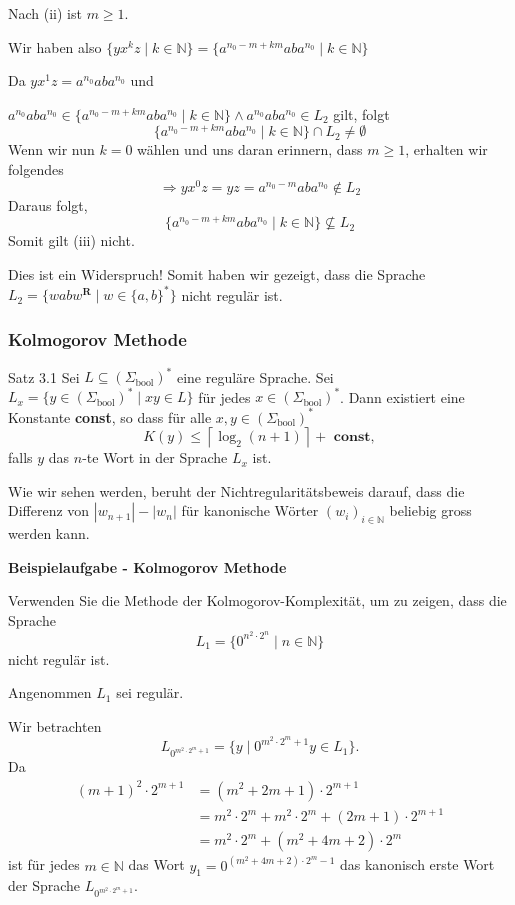 \documentclass[a4paper, 11pt]{article}
\def\N{\mathbb{N}}
\newcommand\myTitle[1]{{\large \textbf {#1}}}
\begin{document}
Nach (ii) ist $m \geq 1$. 

Wir haben also $\{yx^kz \mid k \in \mathbb{N} \} = \{a^{n_0-m+km}aba^{n_0} \mid k \in \mathbb{N} \}$

    Da $yx^1z = a^{n_0}aba^{n_0}$ und

$a^{n_0}aba^{n_0} \in \{a^{n_0-m+km}aba^{n_0} \mid k \in \mathbb{N} \} \land  a^{n_0}aba^{n_0} \in L_2$ gilt, folgt 
$$\{a^{n_0-m+km}aba^{n_0} \mid k \in \mathbb{N} \}  \cap L_2 \neq \emptyset$$
Wenn wir nun $k = 0$ wählen und uns daran erinnern, dass $m \geq 1$, erhalten wir folgendes
$$\Rightarrow yx^0z = yz = a^{n_0-m}aba^{n_0} \notin L_2$$
Daraus folgt,
$$\{a^{n_0-m+km}aba^{n_0} \mid k \in \N \} \nsubseteq L_2$$
Somit gilt (iii) nicht.

Dies ist ein Widerspruch! Somit haben wir gezeigt, dass die Sprache $L_2 = \{wabw^{\textbf{R}} \mid w \in \{a,b\}^*\}$ nicht regulär ist.




    \subsubsection{Kolmogorov Methode}
    \begin{mainbox}{Satz 3.1}
        Sei $L \subseteq (\Sigma_{\text{bool}})^*$ eine reguläre Sprache. Sei $L_x = \{y \in (\Sigma_{\text{bool}})^* \mid xy \in L\}$ für jedes $x\in (\Sigma_{\text{bool}})^*$. Dann existiert eine Konstante \textbf{const}, so dass für alle $x, y \in (\Sigma_\text{bool})^*$
        $$K(y) \leq \left\lceil \log_2(n+1)\right\rceil + \textbf{ const},$$
        falls $y$ das $n$-te Wort in der Sprache $L_x$ ist.
    \end{mainbox}
    Wie wir sehen werden, beruht der Nichtregularitätsbeweis darauf, dass die Differenz von $|w_{n+1}| - |w_n|$ für kanonische Wörter $(w_i)_{i \in \N}$ beliebig gross werden kann.



    \myTitle{Beispielaufgabe - Kolmogorov Methode}

    Verwenden Sie die Methode der Kolmogorov-Komplexität, um zu zeigen, dass die Sprache 
    $$L_1 = \{0^{n^2 \cdot 2^n} \mid n \in \N\}$$
    nicht regulär ist.

    Angenommen $L_1$ sei regulär. 
    
    Wir betrachten 
    $$L_{0^{m^2 \cdot 2^m + 1}} = \{y \mid 0^{m^2 \cdot 2^m + 1}y \in L_1\}.$$
    Da
    \begin{align*}
        (m+1)^2 \cdot 2^{m+1} &= (m^2 + 2m + 1)\cdot 2^{m+1}\\
        &= m^2 \cdot 2^m + m^2 \cdot 2^m + (2m + 1) \cdot 2^{m+1}\\
        &= m^2 \cdot 2^m + (m^2 + 4m + 2) \cdot 2^m
    \end{align*}
    ist für jedes $m \in \N$ das Wort $y_1 = 0^{(m^2 + 4m + 2) \cdot 2^m - 1}$ das kanonisch erste Wort der Sprache $L_{0^{m^2\cdot 2^m +1}}$.
\end{document}
